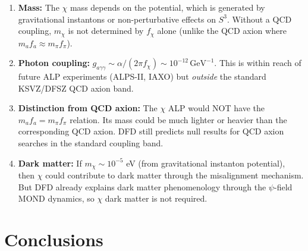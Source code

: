 \documentclass[11pt]{article}
\theoremstyle{definition}
\theoremstyle{remark}
\begin{document}
\begin{enumerate}
\item \textbf{Mass:} The $\chi$ mass depends on the potential, which is
  generated by gravitational instantons or non-perturbative effects on $S^3$.
  Without a QCD coupling, $m_\chi$ is not determined by $f_\chi$ alone (unlike
  the QCD axion where $m_a f_a \approx m_\pi f_\pi$).

\item \textbf{Photon coupling:} $g_{a\gamma\gamma} \sim \alpha/(2\pi f_\chi) \sim 10^{-12}\,\text{GeV}^{-1}$.
  This is within reach of future ALP experiments (ALPS-II, IAXO) but
  \textit{outside} the standard KSVZ/DFSZ QCD axion band.

\item \textbf{Distinction from QCD axion:} The $\chi$ ALP would NOT have the
  $m_a f_a = m_\pi f_\pi$ relation. Its mass could be much lighter or heavier
  than the corresponding QCD axion. DFD still predicts null results for QCD
  axion searches in the standard coupling band.

\item \textbf{Dark matter:} If $m_\chi \sim 10^{-5}$ eV (from gravitational
  instanton potential), then $\chi$ could contribute to dark matter through
  the misalignment mechanism. But DFD already explains dark matter
  phenomenology through the $\psi$-field MOND dynamics, so $\chi$ dark
  matter is not required.
\end{enumerate}


\section{Conclusions}
\label{sec:conclusions}
\end{document}
